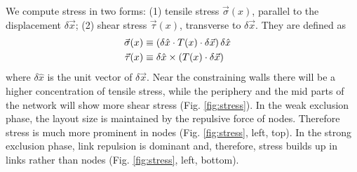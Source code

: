 \documentclass[nofootinbib,preprint,floatfix]{revtex4} %
\begin{document}
We compute stress in two forms: (1) tensile stress $\vec{\sigma}(x)$, parallel to the displacement $\delta \vec{x}$;  
(2) shear stress $\vec{\tau} (x)$, transverse to $\delta \vec{x}$. They are defined as
\begin{align}
    \vec{\sigma}(x)& \equiv \left(\delta \hat{x}\cdot T(x) \cdot \delta \vec{x}\right) \delta\hat{x} \cr
    \vec{\tau }(x)&\equiv \delta \hat{x}\times (T (x)\cdot \delta \vec{x})  
\end{align}
where $ \delta \hat{x}$ is the unit vector of $\delta \vec{x}$. Near the constraining walls there will be a higher concentration of tensile stress, while the periphery and the mid parts of the network will show more shear stress (Fig. \ref{fig:stress}).
In the weak exclusion phase, the layout size is maintained by the repulsive force of nodes.
Therefore stress is much more prominent in nodes (Fig. \ref{fig:stress}, left, top). 
In the strong exclusion phase, link repulsion is dominant and, therefore, stress builds up in links rather than nodes (Fig. \ref{fig:stress}, left, bottom).
\end{document}
